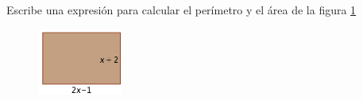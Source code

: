 Escribe una expresión para calcular el perímetro y el área de la figura \ref{fig:20230319035140}

\begin{figure}[H]
    \centering
    \includegraphics[width=0.25\textwidth]{../images/20230319035140}
    \caption{}
    \label{fig:20230319035140}
\end{figure}
